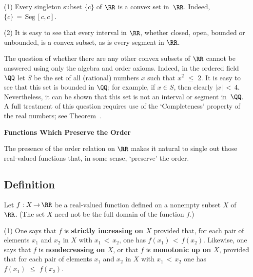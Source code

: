 \V

        (1) Every singleton subset $\{c\}$ of ${\RR}$ is a convex set in~${\RR}$. Indeed, $\{c\} \,=\, \mbox{Seg}\,[c,c]$.

\V

        (2) It is easy to see that every interval in ${\RR}$, whether closed, open, bounded or unbounded, is a convex subset, as is every segment in ${\RR}$.

\V

        The question of whether there are any other convex subsets of ${\RR}$ cannot be answered using only the algebra and order axioms.
    Indeed, in the ordered field ${\QQ}$ let $S$ be the set of all (rational) numbers $x$ such that $x^{2}\,\,{\leq}\,\,2$.
    It is easy to see that this set is bounded in ${\QQ}$; for example, if $x{\in}S$, then clearly $|x|\,<\,4$.
    Nevertheless, it can be shown that this set is not an interval or segment in~${\QQ}$.
    A full treatment of this question requires use of the `Completeness' property of the real numbers; see Theorem~.

\V
\V

        {\bf Functions Which Preserve the Order}

\V

        The presence of the order relation on ${\RR}$ makes it natural to single out those real-valued functions that, in some sense, `preserve' the order.

\V

            \subsection{\small{\bf Definition}}
            \label{DefB20.160}

\V

        Let $f:X \,{\rightarrow}\, {\RR}$ be a real-valued function defined on a nonempty subset $X$ of ${\RR}$.
    (The set $X$ need not be the full domain of the function $f$.)

\V

        (1) One says that $f$ is {\bf strictly increasing on $X$} provided that, for each pair of elements $x_{1}$ and $x_{2}$ in $X$ with $x_{1}\,<\,x_{2}$,
    one has $f(x_{1})\,<\,f(x_{2})$. Likewise, one says that $f$ is {\bf nondecreasing on $X$},
    or that $f$ is {\bf monotonic up on $X$}, provided that for each pair of elements $x_{1}$ and $x_{2}$ in $X$ with $x_{1}\,<\,x_{2}$ one has $f(x_{1})\,\,{\leq}\,\,f(x_{2})$.


